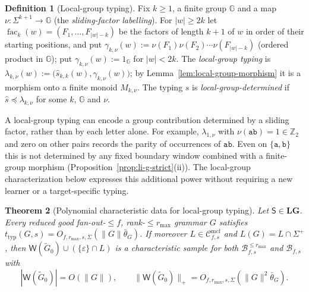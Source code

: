 \documentclass[11pt]{article}
\numberwithin{equation}{section}
\theoremstyle{plain}
\newtheorem{theorem}{Theorem}[section]
\theoremstyle{definition}
\newtheorem{definition}[theorem]{Definition}
\theoremstyle{remark}
\newcommand{\Wit}{\mathsf{W}}
\newcommand{\Cmcf}[2]{\mathcal{C}^{\mathrm{mcf}}_{#1,#2}}
\newcommand{\eps}{\varepsilon}
\begin{document}
\begin{definition}[Local-group typing]
\label{def:local-group-typing}
Fix $k\ge1$, a finite group ${\mathbb G}$ and a map $\nu:\Sigma^{k+1}\to {\mathbb G}$ (the
\emph{sliding-factor labelling}).  For $|w|\ge2k$ let
$\operatorname{fac}_k(w)=(F_1,\ldots,F_{|w|-k})$ be the factors of length $k+1$ of $w$ in
order of their starting positions, and put
$\gamma_{k,\nu}(w):=\nu(F_1)\nu(F_2)\cdots\nu(F_{|w|-k})$ (ordered product in
${\mathbb G}$); put $\gamma_{k,\nu}(w):=1_{\mathbb G}$ for $|w|<2k$.  The \emph{local-group typing}
is $\lambda_{k,\nu}(w):=\bigl(\widehat s_{k,k}(w),\gamma_{k,\nu}(w)\bigr)$; by
Lemma~\ref{lem:local-group-morphism} it is a morphism onto a finite monoid
$M_{k,\nu}$.  The typing $s$ is \emph{local-group-determined} if
$\widehat s\preceq\lambda_{k,\nu}$ for some $k$, ${\mathbb G}$ and $\nu$.
\end{definition}

A local-group typing can encode a group contribution determined by a
sliding factor, rather than by each letter alone.  For example,
$\lambda_{1,\nu}$ with $\nu(\mathtt{ab})=1\in\mathbb Z_2$ and zero on
other pairs records the parity of occurrences of $\mathtt{ab}$.
Even on $\{\mathtt a,\mathtt b\}$ this is not determined by any
fixed boundary window combined with a finite-group morphism
(Proposition~\ref{prop:li-g-strict}(ii)).  The local-group
characterization below expresses this additional power without
requiring a new learner or a target-specific typing.


\begin{theorem}[Polynomial characteristic data for local-group typing]
\label{thm:local-group-polydata}
Let $\mathsf S\in\mathbf{LG}$.  Every reduced good fan-out-$\le f$,
rank-$\le r_{\max}$ grammar $G$ satisfies
$t_{\mathrm{typ}}(G,s)=O_{f,r_{\max},s,\Sigma}(\|G\|\bar\theta_G)$.  If moreover
$L\in\Cmcf{f}{s}$ and $L(G)=L\cap\Sigma^+$, then
$\Wit(\widetilde G_0)\cup(\{\eps\}\cap L)$ is a characteristic sample for both
$\mathcal B^{\le r_{\max}}_{f,s}$ and $\mathcal B_{f,s}$ with
\[
 |\Wit(\widetilde G_0)|=O(\|G\|),\qquad
 \|\Wit(\widetilde G_0)\|_+=O_{f,r_{\max},s,\Sigma}(\|G\|^2\bar\theta_G).
\]
\end{theorem}
\end{document}
